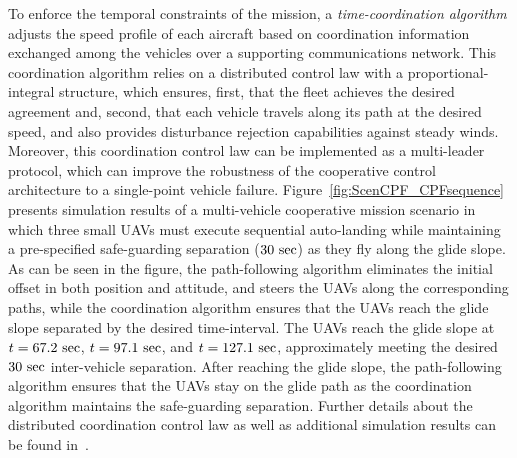 \documentclass[letter,onecolumn,12pt]{aiaa-tc}
\newcommand{\1}{1_n}
\begin{document}
To enforce the temporal constraints of the mission, a \emph{time-coordination algorithm} adjusts the speed profile of each aircraft based on coordination information exchanged among the vehicles over a supporting communications network. This coordination algorithm relies on a distributed control law with a proportional-integral structure, which ensures, first, that the fleet achieves the desired agreement and, second, that each vehicle travels along its path at the desired speed, and also provides disturbance rejection capabilities against steady winds. Moreover, this coordination control law can be implemented as a multi-leader protocol, which can improve the robustness of the cooperative control architecture to a single-point vehicle failure. Figure~\ref{fig:ScenCPF_CPFsequence} presents simulation results of a multi-vehicle cooperative mission scenario in which three small UAVs must execute sequential auto-landing while maintaining a pre-specified safe-guarding separation ($30~{\rm sec}$) as they fly along the glide slope. As can be seen in the figure, the path-following algorithm eliminates the initial offset in both position and attitude, and steers the UAVs along the corresponding paths, while the coordination algorithm ensures that the UAVs reach the glide slope separated by the desired time-interval. The UAVs reach the glide slope at ${t=67.2~{\rm sec}}$, ${t=97.1~{\rm sec}}$, and ${t=127.1~{\rm sec}}$, approximately meeting the desired $30~{\rm sec}$ inter-vehicle separation. After reaching the glide slope, the path-following algorithm ensures that the UAVs stay on the glide path as the coordination algorithm maintains the safe-guarding separation. Further details about the distributed coordination control law as well as additional simulation results can be found in~\cite{JGCD13_CPF,XargayPhd}.
\end{document}
